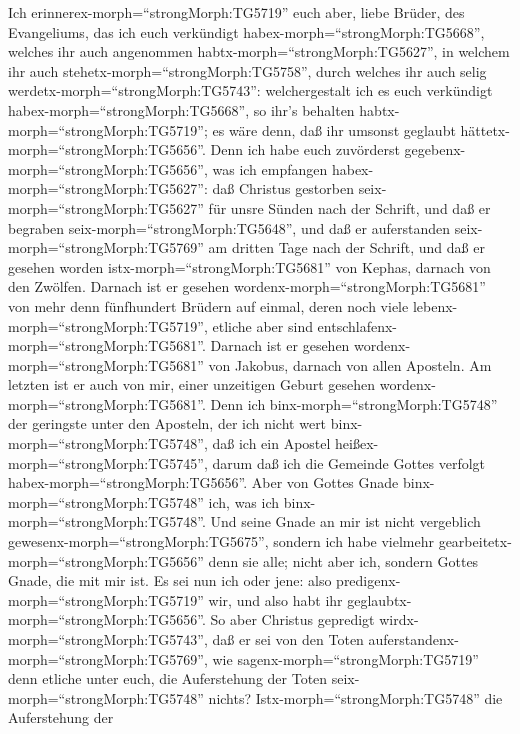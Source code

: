  Ich erinnerex-morph=``strongMorph:TG5719'' euch aber, liebe
Brüder, des Evangeliums, das ich euch verkündigt
habex-morph=``strongMorph:TG5668'', welches ihr auch angenommen
habtx-morph=``strongMorph:TG5627'', in welchem ihr auch
stehetx-morph=``strongMorph:TG5758'',  durch welches ihr
auch selig werdetx-morph=``strongMorph:TG5743'': welchergestalt ich es
euch verkündigt habex-morph=``strongMorph:TG5668'', so ihr's behalten
habtx-morph=``strongMorph:TG5719''; es wäre denn, daß ihr umsonst
geglaubt hättetx-morph=``strongMorph:TG5656''.  Denn ich
habe euch zuvörderst gegebenx-morph=``strongMorph:TG5656'', was ich
empfangen habex-morph=``strongMorph:TG5627'': daß Christus gestorben
seix-morph=``strongMorph:TG5627'' für unsre Sünden nach der Schrift,
 und daß er begraben seix-morph=``strongMorph:TG5648'', und
daß er auferstanden seix-morph=``strongMorph:TG5769'' am dritten Tage
nach der Schrift,  und daß er gesehen worden
istx-morph=``strongMorph:TG5681'' von Kephas, darnach von den Zwölfen.
 Darnach ist er gesehen wordenx-morph=``strongMorph:TG5681''
von mehr denn fünfhundert Brüdern auf einmal, deren noch viele
lebenx-morph=``strongMorph:TG5719'', etliche aber sind
entschlafenx-morph=``strongMorph:TG5681''.  Darnach ist er
gesehen wordenx-morph=``strongMorph:TG5681'' von Jakobus, darnach von
allen Aposteln.  Am letzten ist er auch von mir, einer
unzeitigen Geburt gesehen wordenx-morph=``strongMorph:TG5681''.
 Denn ich binx-morph=``strongMorph:TG5748'' der geringste
unter den Aposteln, der ich nicht wert
binx-morph=``strongMorph:TG5748'', daß ich ein Apostel
heißex-morph=``strongMorph:TG5745'', darum daß ich die Gemeinde Gottes
verfolgt habex-morph=``strongMorph:TG5656''.  Aber von
Gottes Gnade binx-morph=``strongMorph:TG5748'' ich, was ich
binx-morph=``strongMorph:TG5748''. Und seine Gnade an mir ist nicht
vergeblich gewesenx-morph=``strongMorph:TG5675'', sondern ich habe
vielmehr gearbeitetx-morph=``strongMorph:TG5656'' denn sie alle; nicht
aber ich, sondern Gottes Gnade, die mit mir ist.  Es sei
nun ich oder jene: also predigenx-morph=``strongMorph:TG5719'' wir, und
also habt ihr geglaubtx-morph=``strongMorph:TG5656''.  So
aber Christus gepredigt wirdx-morph=``strongMorph:TG5743'', daß er sei
von den Toten auferstandenx-morph=``strongMorph:TG5769'', wie
sagenx-morph=``strongMorph:TG5719'' denn etliche unter euch, die
Auferstehung der Toten seix-morph=``strongMorph:TG5748'' nichts?
 Istx-morph=``strongMorph:TG5748'' die Auferstehung der
